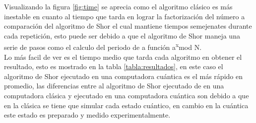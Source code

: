 Visualizando la figura \ref{fig:time} se aprecia como el algoritmo clásico es más inestable en cuanto al tiempo que tarda en lograr la factorización del número
a comparación del algoritmo de Shor el cual mantiene tiempos semejenates durante cada repetición, esto puede ser debido a que el algoritmo de Shor maneja una serie 
de pasos como el calculo del periodo de a función a\textsuperscript{x}mod N.\\
Lo más facil de ver es el tiempo medio que tarda cada algoritmo en obtener el resultado, esto es mostrado en la tabla \ref{tabla:resultados}, en este caso el algoritmo de Shor
ejecutado en una computadora cuántica es el más rápido en promedio, las diferencias entre al algoritmo de Shor ejecutado de en una computadora clásica y ejecutado en una computadora
cuántica son debido a que en la clásica se tiene que simular cada estado cuántico, en cambio en la cuántica este estado es preparado y medido experimentalmente.\\\\

